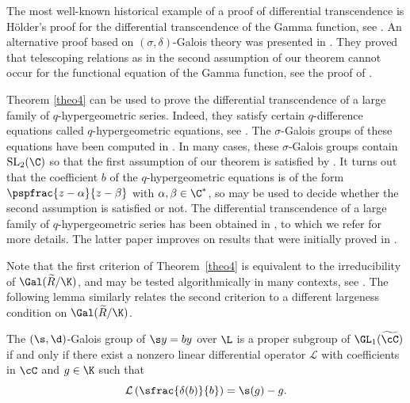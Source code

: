 \begin{remark}
The most well-known historical example of a proof of differential transcendence is Hölder's proof for the differential transcendence of the Gamma function, see \cite{holder1886ueber}. An alternative proof based on $(\sigma,\delta)$-Galois theory was presented in \cite{HS}. They proved that telescoping relations as in the second assumption of our theorem cannot occur for the functional equation of the Gamma function, see the proof of \cite[Cor.\,3.4]{HS}.
\end{remark}

\begin{remark}
Theorem \ref{theo4} can be used to prove the differential transcendence of a large family of $q$-hypergeometric series. Indeed, they satisfy certain $q$-difference equations called $q$-hypergeometric equations, see \cite[Th.\,6]{Ro11}. The $\sigma$-Galois groups of these equations have been computed in \cite[Th.\,6]{Ro11}. In many cases, these $\sigma$\nobreakdash-Galois groups contain $\mathrm{SL}_{2}(\C)$ so that the first assumption of our theorem is satisfied by \cite[Th.\,13]{Hen97}. It turns out that the coefficient $b$ of the $q$-hypergeometric equations is of the form $\pspfrac{z-\alpha}{z-\beta}$ with $\alpha,\beta\in \C^*$, so \cite[Lem.\,6.4]{HS} may be used to decide whether the second assumption is satisfied or not. The differential transcendence of a large family of $q$-hypergeometric series has been obtained in \cite{dreyfus2016functional}, to which we refer for more details. The latter paper improves on results that were initially proved in \cite[Ex.\,3.14]{HS}.
\end{remark}

Note that the first criterion of Theorem~\ref{theo4} is equivalent to the irreducibility of $\Gal(\widetilde{R}/\K)$, and may be tested algorithmically in many contexts, see \cite{Hen97,Hen98,dreyfus2015galois,roques2018algebraic}. The following lemma similarly relates the second criterion to a different largeness condition on $\Gal(\widetilde{R}/\K)$.

\begin{lem}\label{lem2}
The $(\s,\d)$-Galois group of $\s y=by$ over $\L$ is a proper subgroup of $\GL_{1}(\widetilde{\cC})$ if and only if there exist a nonzero linear differential operator $\mathcal{L}$ with coefficients in $\cC$ and $g\in \K$ such that
\[
\mathcal{L}\left(\sfrac{\delta (b)}{b}\right)=\s (g)-g.
\]
\end{lem}

